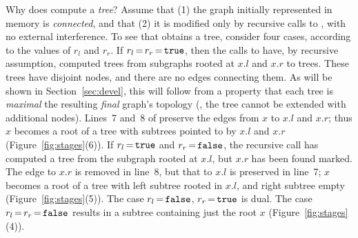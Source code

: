 
Why does  compute a {\em tree}? Assume that
\hypertarget{asm1}{{(1)}} the graph initially represented in memory is
{\em connected}, and that \hypertarget{asm2}{{(2)}} it is modified
only by recursive calls to , with no external
interference. To see that  obtains a tree, consider four
cases, according to the values of $r_l$ and $r_r$. If
$r_l\,{=}\,r_r\,{=}\,\mathtt{\small{true}}$, then the calls to
 have, by recursive assumption, computed trees from
subgraphs rooted at $x.l$ and $x.r$ to trees. These trees have
disjoint nodes, and there are no edges connecting them. As will be
shown in Section~\ref{sec:devel}, this will follow from a property
that each tree is {\em maximal} \wrt the resulting \emph{final}
graph's topology (\ie, the tree cannot be extended with additional
nodes).  Lines~7 and~8 of  preserve the edges from $x$ to
$x.l$ and $x.r$; thus $x$ becomes a root of a tree with subtrees
pointed to by $x.l$ and $x.r$ (Figure~\ref{fig:stages}(6)). If
$r_l\,{=}\,\mathtt{\small{true}}$ and
$r_r\,{=}\,\mathtt{\small{false}}$, the recursive call has computed a
tree from the subgraph rooted at $x.l$, but $x.r$ has been found
marked. The edge to $x.r$ is removed in line~8, but that to $x.l$ is
preserved in line~7; $x$ becomes a root of a tree with left subtree
rooted in $x.l$, and right subtree empty
(Figure~\ref{fig:stages}(5)). The case
$r_l\,{=}\,\mathtt{\small{false}}$, $r_r\,{=}\,\mathtt{\small{true}}$
is dual. The case $r_l\,{=}\,r_r\,{=}\,\mathtt{\small{false}}$ results
in a subtree containing just the root $x$
(Figure~\ref{fig:stages}(4)).

